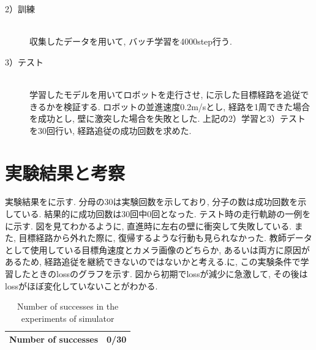 \newpage
\begin{description}
  \item[2）訓練]\mbox{}\\ \hspace*{3mm}収集したデータを用いて, バッチ学習を4000step行う. 
\end{description}

\begin{description}
  \item[3）テスト]\mbox{}\\ \hspace*{3mm}学習したモデルを用いてロボットを走行させ, に示した目標経路を追従できるかを検証する. ロボットの並進速度0.2m/sとし, 経路を1周できた場合を成功とし, 壁に激突した場合を失敗とした. 上記の2）学習と3）テストを30回行い, 経路追従の成功回数を求めた. 
\end{description}

\section{実験結果と考察}
実験結果をに示す. 分母の30は実験回数を示しており, 分子の数は成功回数を示している. 結果的に成功回数は30回中0回となった. テスト時の走行軌跡の一例をに示す. 図を見てわかるように, 直進時に左右の壁に衝突して失敗している. また, 目標経路から外れた際に, 復帰するような行動も見られなかった. 教師データとして使用している目標角速度とカメラ画像のどちらか, あるいは両方に原因があるため, 経路追従を継続できないのではないかと考える.に, この実験条件で学習したときのlossのグラフを示す. 図から初期でlossが減少に急激して, その後はlossがほぼ変化していないことがわかる. 

\begin{table}[h]
  \centering
  \caption{Number of successes in the experiments of simulator}
  \begin{tabular}{|c|c|} \hline
      Number of successes & 0/30 \\ \hline
    \end{tabular}
  \label{tb:exp2}
\end{table}

